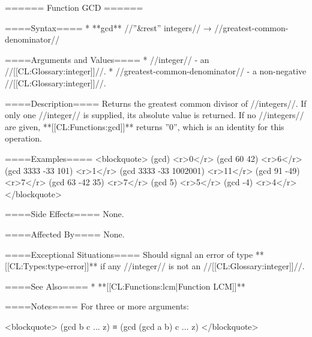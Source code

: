 ====== Function GCD ======

====Syntax====
  * **gcd** //''&rest'' integers// → //greatest-common-denominator//

====Arguments and Values====
  * //integer// - an //[[CL:Glossary:integer]]//.
  * //greatest-common-denominator// - a non-negative //[[CL:Glossary:integer]]//.

====Description====
Returns the greatest common divisor of //integers//. If only one //integer// is supplied, its absolute value is returned. If no //integers// are given, **[[CL:Functions:gcd]]** returns ''0'', which is an identity for this operation.

====Examples====
<blockquote>
(gcd) <r>0</r>
(gcd 60 42) <r>6</r>
(gcd 3333 -33 101) <r>1</r>
(gcd 3333 -33 1002001) <r>11</r>
(gcd 91 -49) <r>7</r>
(gcd 63 -42 35) <r>7</r>
(gcd 5) <r>5</r>
(gcd -4) <r>4</r>
</blockquote>

====Side Effects====
None.

====Affected By====
None.

====Exceptional Situations====
Should signal an error of type **[[CL:Types:type-error]]** if any //integer// is not an //[[CL:Glossary:integer]]//.

====See Also====
  * **[[CL:Functions:lcm|Function LCM]]**

====Notes==== 
For three or more arguments:

<blockquote> 
(gcd b c ... z) ≡ (gcd (gcd a b) c ... z) 
</blockquote>

